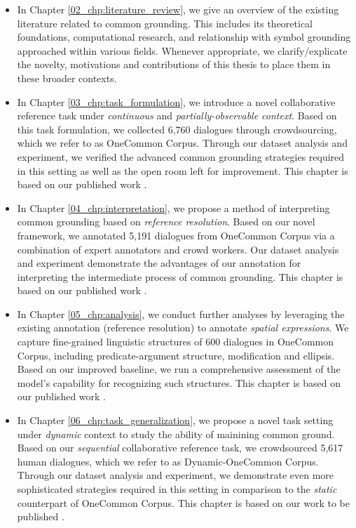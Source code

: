 \begin{itemize}
  \item In Chapter \ref{02_chp:literature_review}, we give an overview of the existing literature related to common grounding. This includes its theoretical foundations, computational research, and relationship with symbol grounding approached within various fields. Whenever appropriate, we clarify/explicate the novelty, motivations and contributions of this thesis to place them in these broader contexts.

  \item In Chapter \ref{03_chp:task_formulation}, we introduce a novel collaborative reference task under \textit{continuous} and \textit{partially-observable context}. Based on this task formulation, we collected 6,760 dialogues through crowdsourcing, which we refer to as OneCommon Corpus. Through our dataset analysis and experiment, we verified the advanced common grounding strategies required in this setting as well as the open room left for improvement. This chapter is based on our published work \citep{udagawa2019natural}.

  \item In Chapter \ref{04_chp:interpretation}, we propose a method of interpreting common grounding based on \textit{reference resolution}. Based on our novel framework, we annotated 5,191 dialogues from OneCommon Corpus via a combination of expert annotators and crowd workers. Our dataset analysis and experiment demonstrate the advantages of our annotation for interpreting the intermediate process of common grounding. This chapter is based on our published work \citep{udagawa2020annotated}.

  \item In Chapter \ref{05_chp:analysis}, we conduct further analyses by leveraging the existing annotation (reference resolution) to annotate \textit{spatial expressions}. We capture fine-grained linguistic structures of 600 dialogues in OneCommon Corpus, including predicate-argument structure, modification and ellipsis. Based on our improved baseline, we run a comprehensive assessment of the model's capability for recognizing such structures. This chapter is based on our published work \citep{udagawa-etal-2020-linguistic}.

  \item In Chapter \ref{06_chp:task_generalization}, we propose a novel task setting under \textit{dynamic} context to study the ability of mainining common ground. Based on our \textit{sequential} collaborative reference task, we crowdsourced 5,617 human dialogues, which we refer to as Dynamic-OneCommon Corpus. Through our dataset analysis and experiment, we demonstrate even more sophisticated strategies required in this setting in comparison to the \textit{static} counterpart of OneCommon Corpus. This chapter is based on our work to be published \citep{udagawa2021maintaining}.


\end{itemize}
